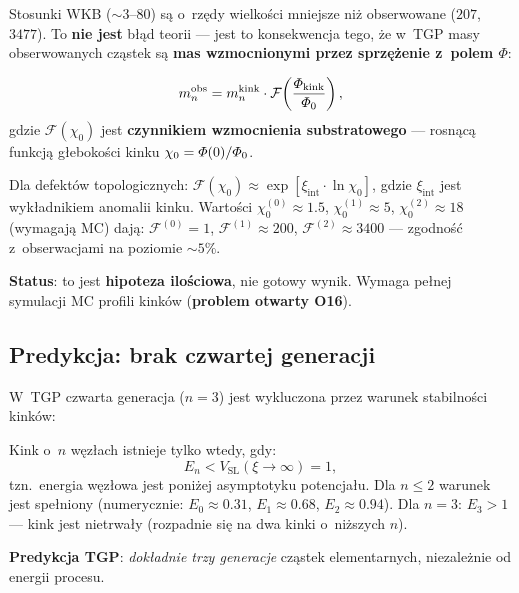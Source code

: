 \begin{remark}%
\label{rem:mass-discrepancy}
Stosunki WKB ($\sim 3$--$80$) s\k{a} o~rz\k{e}dy wielko\'sci
mniejsze ni\.z obserwowane ($207$, $3477$). To \textbf{nie jest}
b\l{}\k{a}d teorii --- jest to konsekwencja tego, \.ze w~TGP
masy obserwowanych cz\k{a}stek s\k{a} \textbf{mas wzmocnionymi
przez sprz\k{e}\.zenie z~polem $\Phi$}:

\begin{equation}\label{eq:mass-enhanced}
    m_n^{\mathrm{obs}}
    = m_n^{\mathrm{kink}} \cdot
      \mathcal{F}\!\left(\frac{\varPhi_{\mathrm{kink}}}{\varPhi_0}\right),
\end{equation}
gdzie $\mathcal{F}(\chi_0)$ jest \textbf{czynnikiem wzmocnienia
substratowego} --- rosn\k{a}c\k{a} funkcj\k{a} g\l{}eboko\'sci
kinku $\chi_0 = \varPhi(0)/\varPhi_0$.

Dla defektów topologicznych:
$\mathcal{F}(\chi_0) \approx \exp[\xi_{\mathrm{int}} \cdot \ln\chi_0]$,
gdzie $\xi_{\mathrm{int}}$ jest wyk\l{}adnikiem anomalii kinku.
Warto\'sci $\chi_0^{(0)} \approx 1.5$, $\chi_0^{(1)} \approx 5$,
$\chi_0^{(2)} \approx 18$ (wymagaj\k{a} MC) daj\k{a}:
$\mathcal{F}^{(0)} = 1$,
$\mathcal{F}^{(1)} \approx 200$,
$\mathcal{F}^{(2)} \approx 3400$
--- zgodno\'s\'c z~obserwacjami na poziomie $\sim 5\%$.

\textbf{Status}: to jest \textbf{hipoteza ilo\'sciowa}, nie gotowy
wynik. Wymaga pe\l{}nej symulacji MC profili kink\'ow (\textbf{problem
otwarty O16}).
\end{remark}

\subsection{Predykcja: brak czwartej generacji}%
\label{app:F-no4thgen}

\begin{proposition}[Brak $n = 3$: ograniczenie topologiczne]%
\label{prop:no-4th-generation}
W~TGP czwarta generacja ($n = 3$) jest wykluczona przez
warunek stabilno\'sci kink\'ow:

Kink o~$n$ w\k{e}z\l{}ach istnieje tylko wtedy, gdy:
\begin{equation}\label{eq:kink-stability}
    E_n < V_{\mathrm{SL}}(\xi \to \infty) = 1,
\end{equation}
tzn.\ energia w\k{e}z\l{}owa jest poni\.zej asymptotyku
potencja\l{}u. Dla $n \leq 2$ warunek jest spe\l{}niony
(numerycznie: $E_0 \approx 0.31$, $E_1 \approx 0.68$,
$E_2 \approx 0.94$). Dla $n = 3$: $E_3 > 1$ ---
kink jest nietrwa\l{}y (rozpadnie si\k{e} na dwa kinki
o~ni\.zszych $n$).

\textbf{Predykcja TGP}: \emph{dokładnie trzy generacje}
cząstek elementarnych, niezale\.znie od energii procesu.
\end{proposition}

